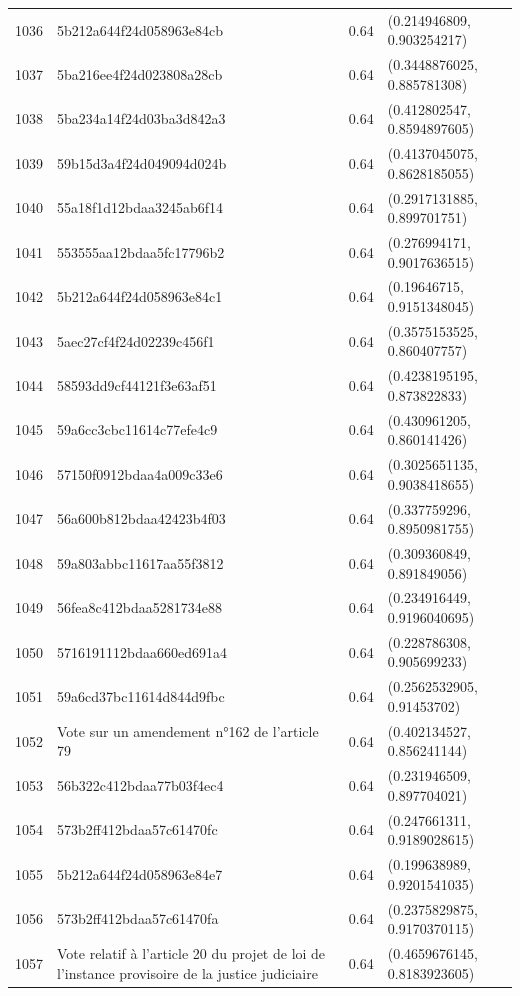 \begin{table}[ht]
\begin{tabular}{rlrl}
  1036 & 5b212a644f24d058963e84cb & 0.64 & (0.214946809, 0.903254217) \\ 
  1037 & 5ba216ee4f24d023808a28cb & 0.64 & (0.3448876025, 0.885781308) \\ 
  1038 & 5ba234a14f24d03ba3d842a3 & 0.64 & (0.412802547, 0.8594897605) \\ 
  1039 & 59b15d3a4f24d049094d024b & 0.64 & (0.4137045075, 0.8628185055) \\ 
  1040 & 55a18f1d12bdaa3245ab6f14 & 0.64 & (0.2917131885, 0.899701751) \\ 
  1041 & 553555aa12bdaa5fc17796b2 & 0.64 & (0.276994171, 0.9017636515) \\ 
  1042 & 5b212a644f24d058963e84c1 & 0.64 & (0.19646715, 0.9151348045) \\ 
  1043 & 5aec27cf4f24d02239c456f1 & 0.64 & (0.3575153525, 0.860407757) \\ 
  1044 & 58593dd9cf44121f3e63af51 & 0.64 & (0.4238195195, 0.873822833) \\ 
  1045 & 59a6cc3cbc11614c77efe4c9 & 0.64 & (0.430961205, 0.860141426) \\ 
  1046 & 57150f0912bdaa4a009c33e6 & 0.64 & (0.3025651135, 0.9038418655) \\ 
  1047 & 56a600b812bdaa42423b4f03 & 0.64 & (0.337759296, 0.8950981755) \\ 
  1048 & 59a803abbc11617aa55f3812 & 0.64 & (0.309360849, 0.891849056) \\ 
  1049 & 56fea8c412bdaa5281734e88 & 0.64 & (0.234916449, 0.9196040695) \\ 
  1050 & 5716191112bdaa660ed691a4 & 0.64 & (0.228786308, 0.905699233) \\ 
  1051 & 59a6cd37bc11614d844d9fbc & 0.64 & (0.2562532905, 0.91453702) \\ 
  1052 & Vote sur un amendement n°162 de l'article 79 & 0.64 & (0.402134527, 0.856241144) \\ 
  1053 & 56b322c412bdaa77b03f4ec4 & 0.64 & (0.231946509, 0.897704021) \\ 
  1054 & 573b2ff412bdaa57c61470fc & 0.64 & (0.247661311, 0.9189028615) \\ 
  1055 & 5b212a644f24d058963e84e7 & 0.64 & (0.199638989, 0.9201541035) \\ 
  1056 & 573b2ff412bdaa57c61470fa & 0.64 & (0.2375829875, 0.9170370115) \\ 
  1057 & Vote relatif à l'article 20 du projet de loi de l'instance provisoire de la justice judiciaire & 0.64 & (0.4659676145, 0.8183923605) \\ 

\end{tabular}
\end{table}
